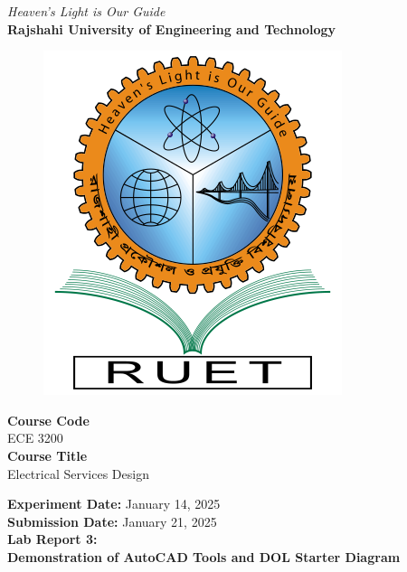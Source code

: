 \vspace*{\fill}
\begin{center}

    \emph{Heaven's Light is Our Guide} \\
    \textbf{Rajshahi University of Engineering and Technology} \\

    \begin{figure}[H]
        \centering
        \includegraphics[scale=.34]{images/RUET_logo.png}
        \label{fig:ruet_logo}
    \end{figure}
    \vspace{5mm}

    \textbf{Course Code}\\
    ECE 3200\\
    \vspace{3mm}
    \textbf{Course Title}\\
    Electrical Services Design

    \vspace{5mm}
    \textbf{Experiment Date:} {January 14, 2025}\\
    \textbf{Submission Date:} {January 21, 2025}\\

    \vspace{5mm}
    \textbf{Lab Report 3: \\ Demonstration of AutoCAD Tools and DOL Starter Diagram}

    \vspace{15mm}


\end{center}
